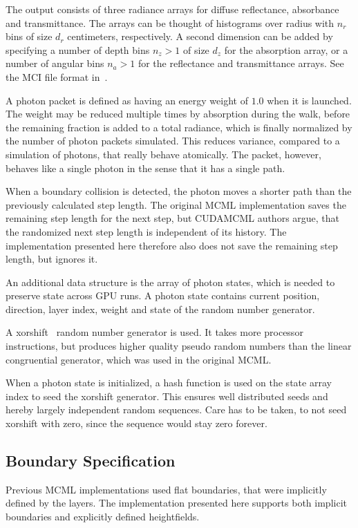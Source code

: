 \documentclass[]{article}
\begin{document}
The output consists of three radiance arrays for diffuse reflectance, absorbance and transmittance. The arrays can be thought of histograms over radius with $n_r$ bins of size $d_r$ centimeters, respectively. A second dimension can be added by specifying a number of depth bins $n_z > 1$ of size $d_z$ for the absorption array, or a number of angular bins $n_a > 1$ for the reflectance and transmittance arrays. See the MCI file format in~\cite{wang1992monte}.

A photon packet is defined as having an energy weight of $1.0$ when it is launched. The weight may be reduced multiple times by absorption during the walk, before the remaining fraction is added to a total radiance, which is finally normalized by the number of photon packets simulated. This reduces variance, compared to a simulation of photons, that really behave atomically. The packet, however, behaves like a single photon in the sense that it has a single path.

When a boundary collision is detected, the photon moves a shorter path than the previously calculated step length. The original MCML implementation saves the remaining step length for the next step, but CUDAMCML authors argue, that the randomized next step length is independent of its history. The implementation presented here therefore also does not save the remaining step length, but ignores it.

An additional data structure is the array of photon states, which is needed to preserve state across GPU runs. A photon state contains current position, direction, layer index, weight and state of the random number generator.

A xorshift~\cite{marsaglia2003xorshift} random number generator is used. It takes more processor instructions, but produces higher quality pseudo random numbers than the linear congruential generator, which was used in the original MCML.

When a photon state is initialized, a hash function is used on the state array index to seed the xorshift generator. This ensures well distributed seeds and hereby largely independent random sequences. Care has to be taken, to not seed xorshift with zero, since the sequence would stay zero forever.

\subsection{Boundary Specification}

Previous MCML implementations used flat boundaries, that were implicitly defined by the layers. The implementation presented here supports both implicit boundaries and explicitly defined heightfields.
\end{document}

